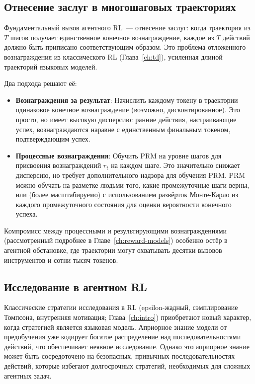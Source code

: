 \subsection{Отнесение заслуг в многошаговых траекториях}
\label{subsec:credit-agentic}

Фундаментальный вызов агентного RL~---
отнесение заслуг: когда траектория из $T$ шагов получает единственное
конечное вознаграждение, каждое из $T$ действий должно быть приписано соответствующим образом.
Это проблема отложенного вознаграждения из классического RL
(Глава~\ref{ch:td}), усиленная длиной траекторий языковых моделей.

Два подхода решают её:

\begin{itemize}[leftmargin=*]
\item \textbf{Вознаграждения за результат}: Начислить каждому токену в траектории
  одинаковое конечное вознаграждение (возможно, дисконтированное). Это просто,
  но имеет высокую дисперсию: ранние действия, настраивающие успех, вознаграждаются
  наравне с единственным финальным токеном, подтверждающим успех.

\item \textbf{Процессные вознаграждения}: Обучить PRM на уровне шагов для присвоения
  вознаграждений $r_t$ на каждом шаге. Это значительно снижает дисперсию,
  но требует дополнительного надзора для обучения PRM. PRM можно
  обучать на разметке людьми того, какие промежуточные шаги
  верны, или (более масштабируемо) с использованием развёрток Монте-Карло из каждого
  промежуточного состояния для оценки вероятности конечного успеха.
\end{itemize}

Компромисс между процессными и результирующими вознаграждениями (рассмотренный подробнее
в Главе~\ref{ch:reward-models}) особенно остёр в
агентной обстановке, где траектории могут охватывать десятки вызовов инструментов
и сотни тысяч токенов.

\subsection{Исследование в агентном RL}
\label{subsec:agentic-exploration}

Классические стратегии исследования в RL (epsilon-жадный, сэмплирование Томпсона,
внутренняя мотивация; Глава~\ref{ch:intro}) приобретают новый
характер, когда стратегией является языковая модель. Априорное знание модели от
предобучения уже кодирует богатое распределение над последовательностями действий,
что обеспечивает неявное исследование. Однако это априорное знание может быть
сосредоточено на безопасных, привычных последовательностях действий, которые избегают
долгосрочных стратегий, необходимых для сложных агентных задач.

